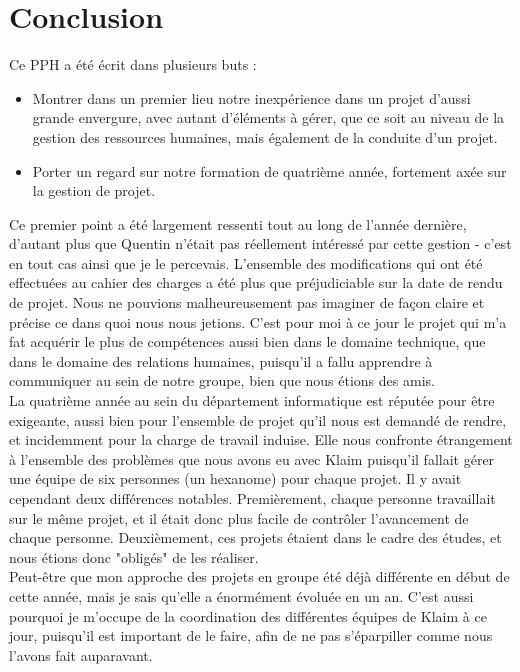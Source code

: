 \documentclass{article}
\begin{document}
	
\section{Conclusion}

		Ce PPH a été écrit dans plusieurs buts : 
		\begin{itemize}
			\item Montrer dans un premier lieu notre inexpérience dans un projet d'aussi grande envergure, avec autant d'éléments à gérer, que ce soit au niveau de la gestion des ressources humaines, mais également de la conduite d'un projet.
			\item Porter un regard sur notre formation de quatrième année, fortement axée sur la gestion de projet. \\
		\end{itemize}
		
		Ce premier point a été largement ressenti tout au long de l'année dernière, d'autant plus que Quentin n'était pas réellement intéressé par cette gestion - c'est en tout cas ainsi que je le percevais. L'ensemble des modifications qui ont été effectuées au cahier des charges a été plus que préjudiciable sur la date de rendu de projet. Nous ne pouvions malheureusement pas imaginer de façon claire et précise ce dans quoi nous nous jetions. C'est pour moi à ce jour le projet qui m'a fat acquérir le plus de compétences aussi bien dans le domaine technique, que dans le domaine des relations humaines, puisqu'il a fallu apprendre à communiquer au sein de notre groupe, bien que nous étions des amis. \\
		
		La quatrième année au sein du département informatique est réputée pour être exigeante, aussi bien  pour l'ensemble de projet qu'il nous est demandé de rendre, et incidemment pour la charge de travail induise. Elle nous confronte étrangement à l'ensemble des problèmes que nous avons eu avec Klaim puisqu'il fallait gérer une équipe de six personnes (un hexanome) pour chaque projet. Il y avait cependant deux différences notables. Premièrement, chaque personne travaillait sur le même projet, et il était donc plus facile de contrôler l'avancement de chaque personne. Deuxièmement, ces projets étaient dans le cadre des études, et nous étions donc "obligés" de les réaliser.\\
		
		Peut-être que mon approche des projets en groupe été déjà différente en début de cette année, mais je sais qu'elle a énormément évoluée en un an. C'est aussi pourquoi je m'occupe de la coordination des différentes équipes de Klaim à ce jour, puisqu'il est important de le faire, afin de ne pas s'éparpiller comme nous l'avons fait auparavant.\\
		
\end{document}
